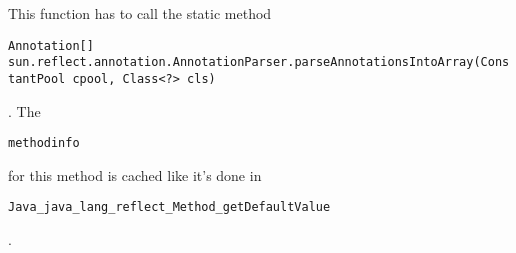\documentclass[a4paper, 10pt, titlepage]{scrartcl} %
\begin{document}
This function has to call the static method \begin{scriptsize}\verb|Annotation|\hspace{0.0pt}\verb|[|\hspace{0.0pt}\verb||\hspace{0.0pt}\verb|]|\hspace{0.0pt}\verb||\hspace{0.0pt}\verb| |\hspace{0.0pt}\verb|sun|\hspace{0.0pt}\verb|.|\hspace{0.0pt}\verb|reflect|\hspace{0.0pt}\verb|.|\hspace{0.0pt}\verb|annotation|\hspace{0.0pt}\verb|.|\hspace{0.0pt}\verb|AnnotationParser|\hspace{0.0pt}\verb|.|\hspace{0.0pt}\verb|parseAnnotationsIntoArray|\hspace{0.0pt}\verb|(|\hspace{0.0pt}\verb|ConstantPool|\hspace{0.0pt}\verb| |\hspace{0.0pt}\verb|cpool|\hspace{0.0pt}\verb|,|\hspace{0.0pt}\verb||\hspace{0.0pt}\verb| |\hspace{0.0pt}\verb|Class|\hspace{0.0pt}\verb|<|\hspace{0.0pt}\verb||\hspace{0.0pt}\verb|?|\hspace{0.0pt}\verb||\hspace{0.0pt}\verb|>|\hspace{0.0pt}\verb||\hspace{0.0pt}\verb| |\hspace{0.0pt}\verb|cls|\hspace{0.0pt}\verb|)|\hspace{0.0pt}\verb||\end{scriptsize}.
The \begin{scriptsize}\verb|methodinfo|\end{scriptsize} for this method is cached like it's done in \begin{scriptsize}\verb|Java_java_lang_reflect_Method_getDefaultValue|\end{scriptsize}.
\end{document}
